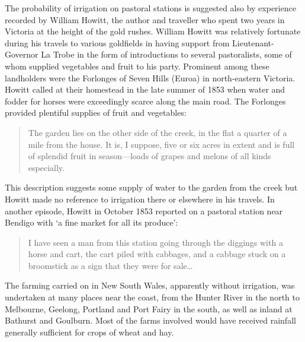 The probability of irrigation on pastoral stations is suggested also
by experience recorded by William Howitt, the author and traveller who
spent two years in Victoria at the height of the gold rushes.  William
Howitt was relatively fortunate during his travels to various
goldfields in having support from Lieutenant-Governor La Trobe in the
form of introductions to several pastoralists, some of whom supplied
vegetables and fruit to his party.  Prominent among these landholders
were the Forlonges of Seven Hills (Euroa) in north-eastern Victoria.
Howitt called at their homestead in the late summer of 1853 when water
and fodder for horses were exceedingly scarce along the main road.
The Forlonges provided plentiful supplies of fruit and vegetables:
\begin{quote}
	The garden lies on the other side of the creek, in the flat a
	quarter of a mile from the house. It is, I suppose, five or
	six acres in extent and is full of splendid fruit in
	season---loads of grapes and melons of all kinds
	especially.
\end{quote}

This description suggests some supply of water to the garden from the
creek but Howitt made no reference to irrigation there or elsewhere in
his travels.  In another episode, Howitt in October 1853 reported on a
pastoral station near Bendigo with `a fine market for all its
produce':
\begin{quote}
	I have seen a man from this station going through the diggings
	with a horse and cart, the cart piled with cabbages, and a
	cabbage stuck on a broomstick as a sign that they were for
	sale\ldots{}
\end{quote}

The farming carried on in New South Wales, apparently without
irrigation, was undertaken at many places near the coast, from the
Hunter River in the north to Melbourne, Geelong, Portland and Port
Fairy in the south, as well as inland at Bathurst and Goulburn.  Most
of the farms involved would have received rainfall generally
sufficient for crops of wheat and hay.


